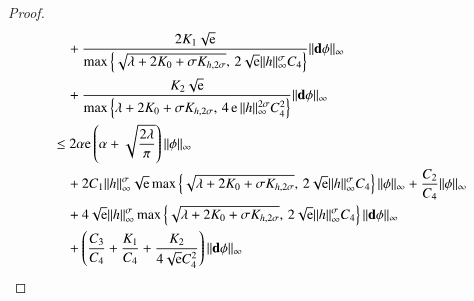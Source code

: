 \documentclass[11pt,reqno]{amsart}
\theoremstyle{definition} \newtheorem{remark}[theorem]{Remark}
\numberwithin{equation}{section}
\newcommand\1{\mathbbm{1}}
\def\bd{{\bf d}}
\def\r{\right}
\def\l{\left} \def\e{\operatorname{e}} \def\dsum{\displaystyle\sum}
\begin{document}
\begin{proof}
\begin{align}
&\quad + \frac{2 K_1\sqrt{\e}}{\max\l\{\sqrt{\lambda+2K_0+\sigma K_{h,2\sigma}},\, 2\sqrt{\e}\|h\|_{\infty}^{\sigma}C_4\r\}}  \|\bd \phi\|_{\infty}\notag\\
&\quad +\frac{K_2 \sqrt{\e} }{\max\l\{\lambda+2K_0+\sigma K_{h,2\sigma},\, 4\e\|h\|_{\infty}^{2\sigma}C_4^2\r\}} \|\bd \phi\|_{\infty}\notag\\
&\leq 2\alpha {\e} \l(\alpha+\sqrt{\frac{2\lambda}{\pi}}\r)\|\phi\|_{\infty}\notag\\
&\quad +2C_1\|h\|_{\infty}^{\sigma}\sqrt{\e} \max \l\{\sqrt{\lambda+2K_0+\sigma K_{h,2\sigma}},\, 2\sqrt{\e}\|h\|_{\infty}^{\sigma}C_4\r\}\|\phi\|_{\infty}+ \frac{C_2}{C_4} \|\phi\|_{\infty} \notag\\
&\quad + 4\sqrt{\e}\|h\|_{\infty}^{\sigma}  \max \l\{\sqrt{\lambda+2K_0+\sigma K_{h,2\sigma}},\, 2\sqrt{\e}\|h\|_{\infty}^{\sigma}C_4\r\} \|\bd \phi\|_{\infty}\notag\\
&\quad +\l(\frac{C_3}{C_4} +\frac{K_1}{C_4} +\frac{K_2}{4\sqrt{\e}C_4^2}\r) \|\bd \phi\|_{\infty}
\end{align}


\end{proof}
\end{document}
